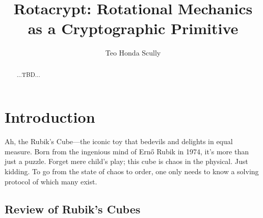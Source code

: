 \documentclass[12pt]{article}
\title{Rotacrypt: Rotational Mechanics as a Cryptographic Primitive}
\author{Teo Honda Scully}
\date{}
\begin{document}
\maketitle

\begin{abstract}
...TBD...
\end{abstract}

\tableofcontents

\newpage

\section{Introduction}

Ah, the Rubik's Cube—the iconic toy that bedevils and delights in equal measure. Born from the ingenious mind of Ernő Rubik in 1974, it's more than just a puzzle. Forget mere child's play; this cube is chaos in the physical. Just kidding. To go from the state of chaos to order, one only needs to know a solving protocol of which many exist.

\subsection{Review of Rubik's Cubes}
\end{document}
